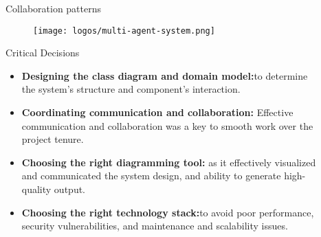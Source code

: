 \documentclass[final]{beamer}
\newlength{\sepwid}
\newlength{\onecolwid}
\newlength{\twocolwid}
\begin{document}
\begin{frame}[t]
\begin{columns}[t]
\begin{column}{\onecolwid}
\begin{block}{Collaboration patterns}
\begin{alertblock}{ }
\end{alertblock}
\begin{figure}[h!]
  \centering
   \texttt{[image: logos/multi-agent-system.png]}
\end{figure}
\end{block}
\begin{block}{Critical Decisions}
\begin{alertblock} { }
\begin{itemize}
    \item \textbf{Designing the class diagram and domain model:}to determine the system's structure and component's interaction.
    \item \textbf{Coordinating communication and collaboration:} Effective communication and collaboration was a key to smooth work over the project tenure.
    \item \textbf{Choosing the right diagramming tool:} as it effectively visualized and communicated the system design, and ability to generate high-quality output.
    \item \textbf{Choosing the right technology stack:}to avoid poor performance, security vulnerabilities, and maintenance and scalability issues.
\end{itemize}
\end{alertblock}

\end{block}



\end{column} %

\begin{column}{\sepwid}\end{column} %

\begin{column}{\twocolwid} %

\begin{columns}[t,totalwidth=\twocolwid] %


\end{columns}
\end{column}
\end{columns}
\end{frame}
\end{document}
